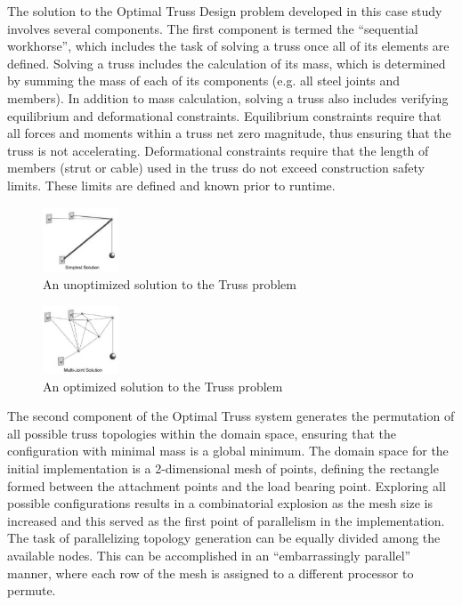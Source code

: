 \documentclass[times,10pt,twocolumn]{article}
\begin{document}
The solution to the Optimal Truss Design problem developed in this case
study involves several components. The first component is termed the
``sequential workhorse'', which includes the task of solving a truss once
all of its elements are defined.  Solving a truss includes the calculation
of its mass, which is determined by summing the mass of each of its
components (e.g. all steel joints and members).  In addition to mass
calculation, solving a truss also includes verifying equilibrium and
deformational constraints.  Equilibrium constraints require that all forces
and moments within a truss net zero magnitude, thus ensuring that the truss
is not accelerating.  Deformational constraints require that the length of
members (strut or cable) used in the truss do not exceed construction
safety limits.  These limits are defined and known prior to runtime.

\begin{figure}[h]
  \centering
  \includegraphics[width=0.2\textwidth]{simple.truss.eps}
  \caption{An unoptimized solution to the Truss problem}
  \label{fig:simple_truss}
\end{figure}

\begin{figure}[h]
  \centering
  \includegraphics[width=0.2\textwidth]{multijoint.truss.eps}
  \caption{An optimized solution to the Truss problem}
  \label{fig:multijoint_truss}
\end{figure}

The second component of the Optimal Truss system generates the permutation
of all possible truss topologies within the domain space, ensuring that the
configuration with minimal mass is a global minimum.  The domain space for
the initial implementation is a 2-dimensional mesh of points, defining the
rectangle formed between the attachment points and the load bearing point.
Exploring all possible configurations results in a combinatorial explosion
as the mesh size is increased and this served as the first point of
parallelism in the implementation.  The task of parallelizing topology
generation can be equally divided among the available nodes.  This can be
accomplished in an ``embarrassingly parallel'' manner, where each row of
the mesh is assigned to a different processor to permute.
\end{document}
